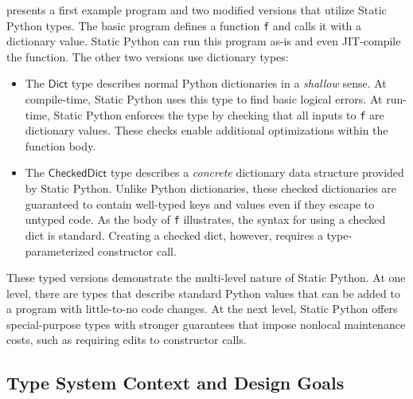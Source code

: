 \documentclass[english,cleveref,crc]{programming}
\newcommand{\SP}{Static Python}
\newcommand{\code}[1]{\texttt{#1}}
\newcommand{\typefont}[1]{\mathsf{#1}}
\newcommand{\sptrawpydict}{\typefont{Dict}}
\newcommand{\sptrawchkdict}{\typefont{CheckedDict}} %
\begin{document}
 presents a first example program and two modified versions that
utilize \SP{} types.
The basic program defines a function \code{f} and calls it with a dictionary
value.
\SP{} can run this program as-is and even JIT-compile the function.
The other two versions use dictionary types:
\begin{itemize}
  \item
    The $\sptrawpydict$ type describes normal Python dictionaries in a \emph{shallow} sense.
    At compile-time, \SP{} uses this type to find basic logical errors.
    At run-time, \SP{} enforces the type by checking that all inputs to \code{f} are
    dictionary values.
    These checks enable additional optimizations within the function body.

  \item
    The $\sptrawchkdict$ type
    describes a \emph{concrete} dictionary data structure provided by \SP{}.
    Unlike Python dictionaries, these checked dictionaries are guaranteed to
    contain well-typed keys and values even if they escape to untyped code.
    As the body of \code{f} illustrates, the syntax for using a checked dict is standard.
    Creating a checked dict, however, requires a type-parameterized constructor call.
\end{itemize}
These typed versions demonstrate the multi-level nature of \SP{}.
At one level, there are types that describe standard Python values that can be added
to a program with little-to-no code changes.
At the next level, \SP{} offers special-purpose types with stronger guarantees that impose
nonlocal maintenance costs, such as requiring edits to constructor calls.


\subsection{Type System Context and Design Goals}
\label{s:ts-context}
\end{document}
